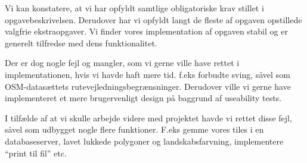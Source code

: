 Vi kan konstatere, at vi har opfyldt samtlige obligatoriske krav stillet i opgavebeskrivelsen. Derudover har vi opfyldt langt de fleste af opgaven opstillede valgfrie ekstraopgaver. Vi finder vores implementation af opgaven stabil og er generelt tilfredse med dens funktionalitet. 

Der er dog nogle fejl og mangler, som vi gerne ville have rettet i implementationen, hvis vi havde haft mere tid. f.eks forbudte sving, såvel som OSM-datasættets rutevejledningsbegrænsninger. Derudover ville vi gerne have implementeret et mere brugervenligt design på baggrund af useability tests. 

I tilfælde af at vi skulle arbejde videre med projektet havde vi rettet disse fejl, såvel som udbygget nogle flere funktioner. F.eks gemme vores tiles i en databaseserver, lavet lukkede polygoner og landskabsfarvning, implementere ``print til fil'' etc. 
